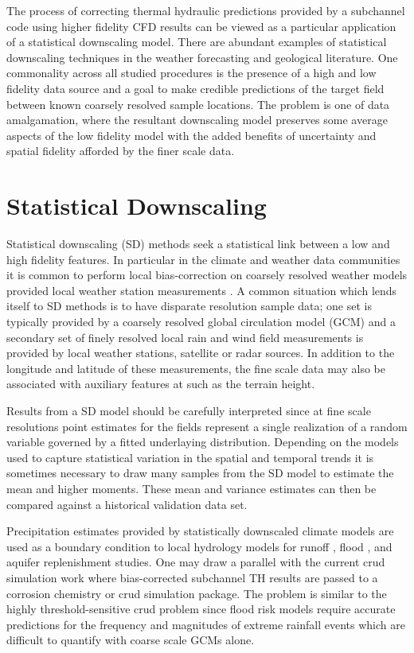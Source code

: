 
The process of correcting thermal hydraulic predictions provided by a subchannel code using higher fidelity CFD results can be viewed as a particular application of a statistical downscaling model.  There are abundant examples of statistical downscaling techniques in the weather forecasting and geological literature.  One commonality across all studied procedures is the presence of a high and low fidelity data source and a goal to make credible predictions of the target field between known coarsely resolved sample locations.  The problem is one of data amalgamation, where the resultant downscaling model preserves some average aspects of the low fidelity model with the added benefits of uncertainty and spatial fidelity afforded by the finer scale data.

\section{Statistical Downscaling}

Statistical downscaling (SD) methods seek a statistical link between a low and high fidelity features.
In particular in the climate and weather data communities it is common to perform local bias-correction on coarsely resolved weather models provided local weather station measurements \cite{wilby1998} \cite{arelia2016} \cite{goly2014}. A common situation which lends itself to SD methods is to have disparate resolution sample data; one set is typically provided by a coarsely resolved global circulation model (GCM) and a secondary set of finely resolved local rain and wind field measurements is provided by local weather stations, satellite or radar sources.  In addition to the longitude and latitude of these measurements, the fine scale data may also be associated with auxiliary features at such as the terrain height.

Results from a SD model should be carefully interpreted since at fine scale resolutions point estimates for the fields represent a single realization of a random variable governed by a fitted underlaying distribution.  Depending on the models used to capture statistical variation in the spatial and temporal trends it is sometimes necessary to draw many samples from the SD model to estimate the mean and higher moments.  These mean and variance estimates can then be compared against a historical validation data set.

Precipitation estimates provided by statistically downscaled climate models are used as a boundary condition to local hydrology models for runoff \cite{wood2002}, flood \cite{hess2007}, and aquifer replenishment studies.  One may draw a parallel with the current crud simulation work where bias-corrected subchannel TH results are passed to a corrosion chemistry or crud simulation package. The problem is similar to the highly threshold-sensitive crud problem since flood risk models require accurate predictions for the frequency and magnitudes of extreme rainfall events which are difficult to quantify with coarse scale GCMs alone.


